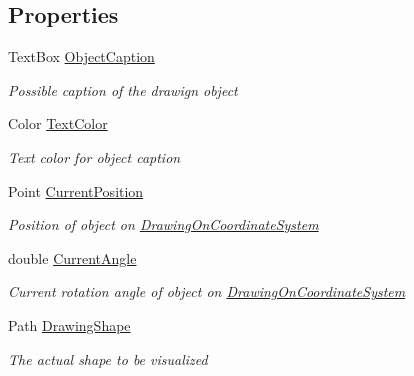 \subsection*{Properties}
\begin{DoxyCompactItemize}
\item 
Text\+Box \hyperlink{class_w_p_f_visualization_base_1_1_drawing_object_a73d9c8f51576e41694183cd35577553b}{Object\+Caption}
\begin{DoxyCompactList}\small\item\em Possible caption of the drawign object \end{DoxyCompactList}\item 
Color \hyperlink{class_w_p_f_visualization_base_1_1_drawing_object_a6d3ff09f6f239b9ee41f21eb83dfca3c}{Text\+Color}
\begin{DoxyCompactList}\small\item\em Text color for object caption \end{DoxyCompactList}\item 
Point \hyperlink{class_w_p_f_visualization_base_1_1_drawing_object_a1afe50e77102673512bcfc65cd4b55f8}{Current\+Position}
\begin{DoxyCompactList}\small\item\em Position of object on \hyperlink{class_w_p_f_visualization_base_1_1_drawing_on_coordinate_system}{Drawing\+On\+Coordinate\+System} \end{DoxyCompactList}\item 
double \hyperlink{class_w_p_f_visualization_base_1_1_drawing_object_a13a8b25a49fd91e218208a22fde834ec}{Current\+Angle}
\begin{DoxyCompactList}\small\item\em Current rotation angle of object on \hyperlink{class_w_p_f_visualization_base_1_1_drawing_on_coordinate_system}{Drawing\+On\+Coordinate\+System} \end{DoxyCompactList}\item 
Path \hyperlink{class_w_p_f_visualization_base_1_1_drawing_object_a4906eb5cece71ac4575edfa5e9af4b39}{Drawing\+Shape}
\begin{DoxyCompactList}\small\item\em The actual shape to be visualized \end{DoxyCompactList}\item 

\end{DoxyCompactItemize}
